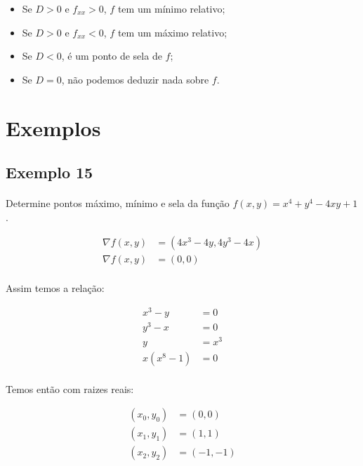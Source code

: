 \documentclass{article}
\begin{document}
            \begin{itemize}
                \item Se $D > 0$ e $f_{xx} > 0$, $f$ tem um mínimo relativo;
                \item Se $D > 0$ e $f_{xx} < 0$, $f$ tem um máximo relativo;
                \item Se $D < 0$, é um ponto de sela de $f$;
                \item Se $D = 0$, não podemos deduzir nada sobre $f$.
            \end{itemize}

    \section{Exemplos}
        \subsection{Exemplo 15}
            \paragraph{}
            Determine pontos máximo, mínimo e sela da função $f(x, y) = x^4 + y^4 - 4xy + 1$.

            \begin{align*}
                \nabla f(x, y) &= (4x^3 - 4y, 4y^3 - 4x)\\
                \nabla f(x, y) &= (0, 0)
            \end{align*}

            \paragraph{}
            Assim temos a relação:

            \begin{align*}
                x^3 - y &= 0\\
                y^3 - x &= 0\\
                y &= x^3\\
                x (x^8 - 1) &= 0
            \end{align*}

            \paragraph{}
            Temos então com raizes reais:

            \begin{align*}
                (x_0, y_0) &= (0, 0)\\
                (x_1, y_1) &= (1, 1)\\
                (x_2, y_2) &= (-1, -1)\\
            \end{align*}
\end{document}
